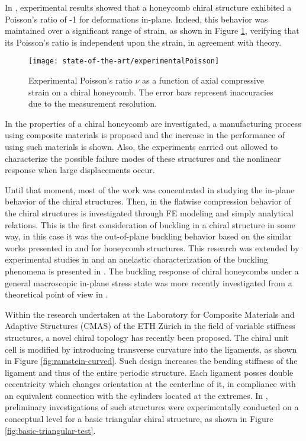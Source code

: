   In \cite{Prall1997}, experimental results showed that a honeycomb chiral structure exhibited a Poisson's ratio of -1 for deformations in-plane. Indeed, this behavior was maintained over a significant range of strain, as shown in Figure \ref{fig:experimentalPoisson}, verifying that its Poisson's ratio is independent upon the strain, in agreement with theory. 

  \begin{figure}[!htpb]
    \centering
    \texttt{[image: state-of-the-art/experimentalPoisson]}
    \caption[Experimental Poisson's ratio $v$ as a function of axial compressive strain on a chiral honeycomb]{Experimental Poisson's ratio $\nu$ as a function of axial compressive strain on a chiral honeycomb. The error bars represent inaccuracies due to the measurement resolution. \cite{Prall1997}}\label{fig:experimentalPoisson}
  \end{figure}

  In \cite{Bettini2010} the properties of a chiral honeycomb are investigated, a manufacturing process using composite materials is proposed and the increase in the performance of using such materials is shown. Also, the experiments carried out allowed to characterize the possible failure modes of these structures and the nonlinear response when large displacements occur.

  Until that moment, most of the work was concentrated in studying the in-plane behavior of the chiral structures. Then, in \cite{Spadoni2005} the flatwise compression behavior of the chiral structures is investigated through FE modeling and simply analytical relations. This is the first consideration of buckling in a chiral structure in some way, in this case it was the out-of-plane buckling behavior based on the similar works presented in \cite{Zhang1992} and \cite{Gibson1999} for honeycomb structures. This research was extended by experimental studies in \cite{Scarpa2007} and an anelastic characterization of the buckling phenomena is presented in \cite{Miller2010}. The buckling response of chiral honeycombs under a general macroscopic in-plane stress state was more recently investigated from a theoretical point of view in \cite{Haghpanah2014}. 

  Within the research undertaken at the Laboratory for Composite Materials and Adaptive Structures (CMAS) of the ETH Z\"urich in the field of variable stiffness structures, a novel chiral topology has recently been proposed. The chiral unit cell is modified by introducing transverse curvature into the ligaments, as shown in Figure \ref{fig:ramstein-curved}. Such design increases the bending stiffness of the ligament and thus of the entire periodic structure. Each ligament posses double eccentricity which changes orientation at the centerline of it, in compliance with an equivalent connection with the cylinders located at the extremes. In \cite{Ramstein2016}, preliminary investigations of such structures were experimentally conducted on a conceptual level for a basic triangular chiral structure, as shown in Figure \ref{fig:basic-triangular-test}.

